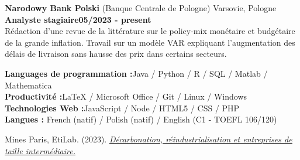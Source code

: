 \noindent\textbf{Narodowy Bank Polski} (Banque Centrale de Pologne) \hfill Varsovie, Pologne \\[0.1cm]
\textbf{Analyste stagiaire}\hfill \textbf{05/2023 - present} \\
Rédaction d'une revue de la littérature sur le policy-mix monétaire et budgétaire de la grande inflation. Travail sur un modèle VAR expliquant l'augmentation des délais de livraison sans hausse des prix dans certains secteurs. 

	\begin{flushleft}
	\raisebox{-.6ex}{COMPÉTENCES} \hrulefill
	\end{flushleft}



  \noindent\textbf{Languages de programmation :}\hfill{Java / Python / R / SQL / Matlab / Mathematica} \\
  \textbf{Productivité :}\hfill LaTeX / Microsoft Office / Git / Linux / Windows\\
  \textbf{Technologies Web :}\hfill JavaScript / Node / HTML5 / CSS / PHP  \\
  \textbf{Langues :} \hfill French (natif) / Polish (natif) / English (C1 - TOEFL 106/120) 

	\begin{flushleft}
	\raisebox{-.6ex}{CONTRIBUTIONS \& PROJETS} \hrulefill
	\end{flushleft}

\noindent Mines Paris, EtiLab. (2023).  \href{https://etilab.minesparis.psl.eu/wp-content/uploads/2023/12/etilab-decarboner-les-ETI-04dec23.pdf}{\underline{\emph{Décarbonation, réindustrialisation et entreprises de taille intermédiaire.}}}